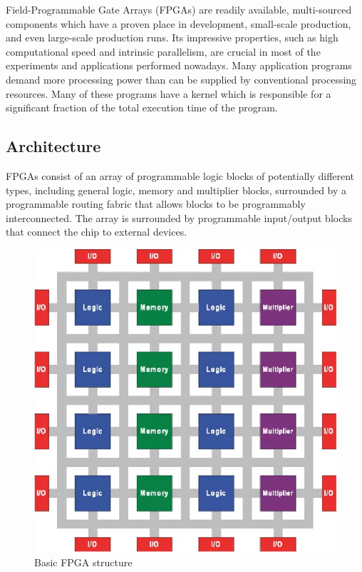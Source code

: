 Field-Programmable Gate Arrays (FPGAs) are readily available, multi-sourced components which have a proven place in development, small-scale production, and even large-scale production runs. 
Its impressive properties, such as high computational speed and intrinsic parallelism, are crucial in most of the experiments and applications performed nowadays.
Many application programs demand more processing power than can be supplied by conventional processing resources. Many of these programs have a kernel which is responsible for a significant fraction of the total execution time of the program. 

\subsection{Architecture}
FPGAs consist of an array of programmable logic blocks of potentially different types, including general logic, memory and multiplier blocks, surrounded by a programmable routing fabric that allows blocks to be programmably interconnected. The array is surrounded by programmable input/output blocks that connect the chip to external devices\cite{fpgaStructureBook}.

\begin{figure}[H]
    \centering
    \includegraphics[width=0.5\linewidth]{img/fpgaStructure.png}
    \caption{Basic FPGA structure\cite{fpgaStructureBook}}
    \label{fig:fpgaStructure}
\end{figure}

